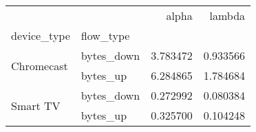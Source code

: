 \begin{tabular}{llrr}
\toprule
 &  & alpha & lambda \\
device_type & flow_type &  &  \\
\midrule
\multirow[t]{2}{*}{Chromecast} & bytes_down & 3.783472 & 0.933566 \\
 & bytes_up & 6.284865 & 1.784684 \\
\cline{1-4}
\multirow[t]{2}{*}{Smart TV} & bytes_down & 0.272992 & 0.080384 \\
 & bytes_up & 0.325700 & 0.104248 \\
\cline{1-4}
\bottomrule
\end{tabular}
